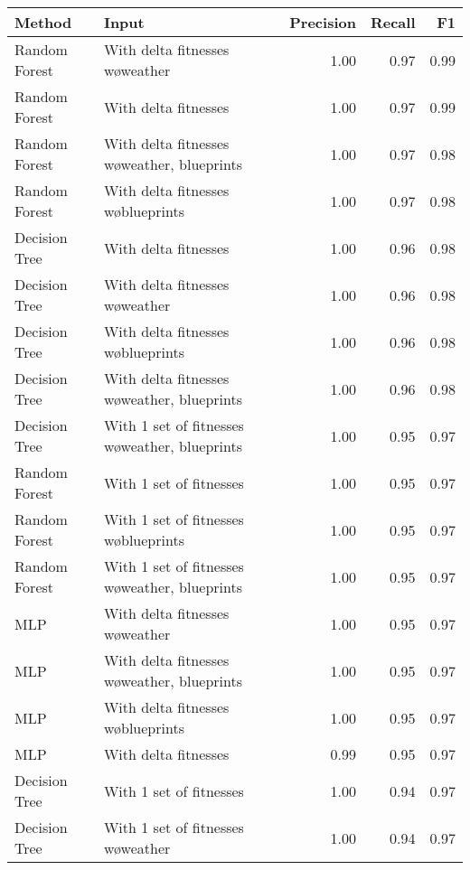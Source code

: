 \begin{tabular}{llrrr}
\toprule
        Method &                                           Input &  Precision &  Recall &   F1 \\
\midrule
 Random Forest &                With delta fitnesses w\o weather &       1.00 &    0.97 & 0.99 \\
 Random Forest &                            With delta fitnesses &       1.00 &    0.97 & 0.99 \\
 Random Forest &    With delta fitnesses w\o weather, blueprints &       1.00 &    0.97 & 0.98 \\
 Random Forest &             With delta fitnesses w\o blueprints &       1.00 &    0.97 & 0.98 \\
 Decision Tree &                            With delta fitnesses &       1.00 &    0.96 & 0.98 \\
 Decision Tree &                With delta fitnesses w\o weather &       1.00 &    0.96 & 0.98 \\
 Decision Tree &             With delta fitnesses w\o blueprints &       1.00 &    0.96 & 0.98 \\
 Decision Tree &    With delta fitnesses w\o weather, blueprints &       1.00 &    0.96 & 0.98 \\
 Decision Tree & With 1 set of fitnesses w\o weather, blueprints &       1.00 &    0.95 & 0.97 \\
 Random Forest &                         With 1 set of fitnesses &       1.00 &    0.95 & 0.97 \\
 Random Forest &          With 1 set of fitnesses w\o blueprints &       1.00 &    0.95 & 0.97 \\
 Random Forest & With 1 set of fitnesses w\o weather, blueprints &       1.00 &    0.95 & 0.97 \\
           MLP &                With delta fitnesses w\o weather &       1.00 &    0.95 & 0.97 \\
           MLP &    With delta fitnesses w\o weather, blueprints &       1.00 &    0.95 & 0.97 \\
           MLP &             With delta fitnesses w\o blueprints &       1.00 &    0.95 & 0.97 \\
           MLP &                            With delta fitnesses &       0.99 &    0.95 & 0.97 \\
 Decision Tree &                         With 1 set of fitnesses &       1.00 &    0.94 & 0.97 \\
 Decision Tree &             With 1 set of fitnesses w\o weather &       1.00 &    0.94 & 0.97 \\

\end{tabular}
